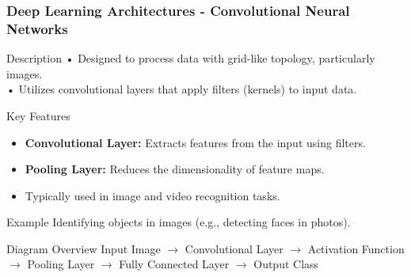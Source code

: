 \documentclass[aspectratio=169]{beamer}
\begin{document}
\begin{frame}[fragile]
    \frametitle{Deep Learning Architectures - Convolutional Neural Networks}
    
    \begin{block}{Description}
        • Designed to process data with grid-like topology, particularly images. \\
        • Utilizes convolutional layers that apply filters (kernels) to input data.
    \end{block}
    
    \begin{block}{Key Features}
        \begin{itemize}
            \item \textbf{Convolutional Layer:} Extracts features from the input using filters.
            \item \textbf{Pooling Layer:} Reduces the dimensionality of feature maps.
            \item Typically used in image and video recognition tasks.
        \end{itemize}
    \end{block}
    
    \begin{block}{Example}
        Identifying objects in images (e.g., detecting faces in photos).
    \end{block}
    
    \begin{block}{Diagram Overview}
        Input Image $\rightarrow$ Convolutional Layer $\rightarrow$ Activation Function $\rightarrow$ Pooling Layer $\rightarrow$ Fully Connected Layer $\rightarrow$ Output Class
    \end{block}
\end{frame}
\end{document}
